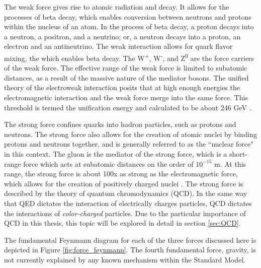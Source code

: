 The weak force gives rise to atomic radiation and decay. It allows for the processes of beta decay, which enables conversion between neutrons and protons within the nucleus of an atom. In the process of beta decay, a proton decays into a neutron, a positron, and a neutrino; or, a neutron decays into a proton, an electron and an antineutrino. The weak interaction allows for quark flavor mixing, the which enables beta decay. The W\textsuperscript{+}, W\textsuperscript{-}, and Z\textsuperscript{0} are the force carriers of the weak force. The effective range of the weak force is limited to subatomic distances, as a result of the massive nature of the mediator bosons. The unified theory of the electroweak interaction posits that at high enough energies the electromagnetic interaction and the weak force merge into the same force. This threshold is termed the unification energy and calculated to be about 246 GeV \cite{vev}. \par

The strong force confines quarks into hadron particles, such as protons and neutrons. The strong force also allows for the creation of atomic nuclei by binding protons and neutrons together, and is generally referred to as the ``nuclear force" in this context. The gluon is the mediator of the strong force, which is a short-range force which acts at subatomic distances on the order of $10^{-15}$ m. At this range, the strong force is about 100x as strong as the electromagnetic force, which allows for the creation of positively charged nuclei \cite{griffiths}. The strong force is described by the theory of quantum chromodynamics (QCD). In the same way that QED dictates the interaction of electrically charges particles, QCD dictates the interactions of \textit{color-charged} particles. Due to the particular importance of QCD in this thesis, this topic will be explored in detail in section \ref{sec:QCD}. \par

The fundamental Feynmann diagram for each of the three forces discussed here is depicted in Figure \ref{fig:force_feynmann}. The fourth fundamental force, gravity, is not currently explained by any known mechanism within the Standard Model. 

